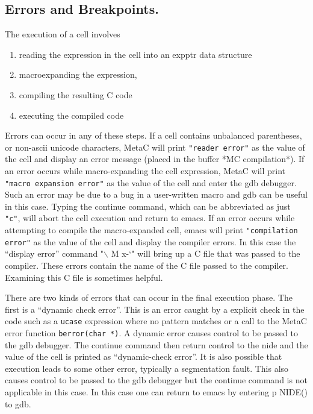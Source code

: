 \documentclass{article}
\begin{document}
\subsection{Errors and Breakpoints.}

The execution of a cell involves

\begin{enumerate}
  \item reading the expression in the cell into an expptr data structure
  \item macroexpanding the expression,
  \item compiling the resulting C code
  \item executing the compiled code
\end{enumerate}

Errors can occur in any of these steps. If a cell contains unbalanced parentheses, or non-ascii unicode characters, MetaC will print
{\tt "reader error"} as the value of the cell and display an error message (placed in the buffer *MC compilation*).
If an error occurs while macro-expanding the cell expression, MetaC will print {\tt "macro expansion error"}
as the value of the cell and enter the
gdb debugger.  Such an error may be
due to a bug in a user-written macro and gdb can be useful in this case.
Typing the continue command, which can be abbreviated as just {\tt "c"}, will abort the cell execution and return to emacs.
If an error occurs while attempting to compile the macro-expanded cell, emacs will print {\tt "compilation error"} as the value of the cell
and display the compiler errors.  In this case the ``display error'' command "$\backslash$ M x-`" will bring up a C file that was passed to the compiler.
These errors contain the name of the C file passed to the compiler.  Examining this C file is sometimes helpful.

There are two kinds of errors that can occur in the final execution phase.  The first is a ``dynamic check error''.  This is an error caught
by a explicit check in the code such as a {\tt ucase} expression where no pattern matches or a call to the MetaC error function {\tt berror(char *)}.
A dynamic error causes control to be passed to the gdb debugger.  The continue command then return control to the nide and the value of the cell is
printed as ``dynamic-check error''.  It is also possible that execution leads to some other error, typically a segmentation fault.  This also causes
control to be passed to the gdb debugger but the continue command is not applicable in this case.  In this case one can return to emacs by
entering p NIDE() to gdb.
\end{document}
